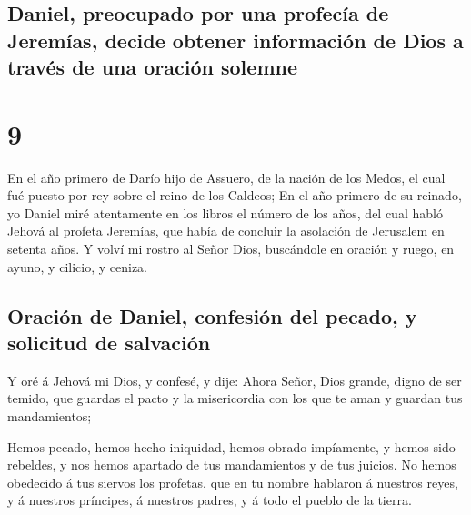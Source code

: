 \hypertarget{daniel-preocupado-por-una-profecuxeda-de-jeremuxedas-decide-obtener-informaciuxf3n-de-dios-a-travuxe9s-de-una-oraciuxf3n-solemne}{%
\subsection{Daniel, preocupado por una profecía de Jeremías, decide
obtener información de Dios a través de una oración
solemne}\label{daniel-preocupado-por-una-profecuxeda-de-jeremuxedas-decide-obtener-informaciuxf3n-de-dios-a-travuxe9s-de-una-oraciuxf3n-solemne}}

\hypertarget{section-8}{%
\section{9}\label{section-8}}

 En el año primero de Darío hijo de Assuero, de la nación de
los Medos, el cual fué puesto por rey sobre el reino de los Caldeos;
 En el año primero de su reinado, yo Daniel miré atentamente
en los libros el número de los años, del cual habló Jehová al profeta
Jeremías, que había de concluir la asolación de Jerusalem en setenta
años.  Y volví mi rostro al Señor Dios, buscándole en
oración y ruego, en ayuno, y cilicio, y ceniza.

\hypertarget{oraciuxf3n-de-daniel-confesiuxf3n-del-pecado-y-solicitud-de-salvaciuxf3n}{%
\subsection{Oración de Daniel, confesión del pecado, y solicitud de
salvación}\label{oraciuxf3n-de-daniel-confesiuxf3n-del-pecado-y-solicitud-de-salvaciuxf3n}}

 Y oré á Jehová mi Dios, y confesé, y dije: Ahora Señor,
Dios grande, digno de ser temido, que guardas el pacto y la misericordia
con los que te aman y guardan tus mandamientos;

 Hemos pecado, hemos hecho iniquidad, hemos obrado
impíamente, y hemos sido rebeldes, y nos hemos apartado de tus
mandamientos y de tus juicios.  No hemos obedecido á tus
siervos los profetas, que en tu nombre hablaron á nuestros reyes, y á
nuestros príncipes, á nuestros padres, y á todo el pueblo de la tierra.


